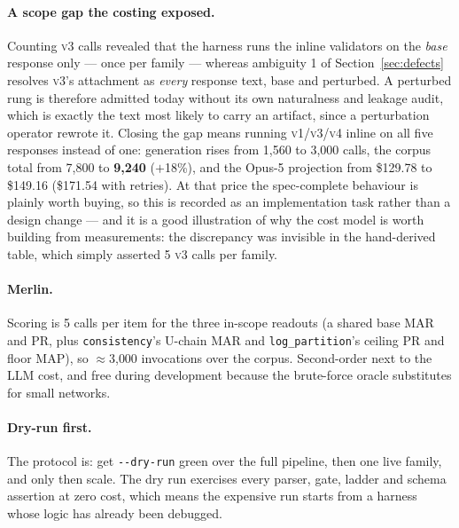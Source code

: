 \documentclass[11pt]{article}
\newcommand{\readout}[1]{\texttt{#1}}
\begin{document}
\paragraph{A scope gap the costing exposed.} Counting \textsc{v3} calls revealed that the harness
runs the inline validators on the \emph{base} response only --- once per family --- whereas
ambiguity 1 of Section~\ref{sec:defects} resolves \textsc{v3}'s attachment as \emph{every} response
text, base and perturbed. A perturbed rung is therefore admitted today without its own naturalness
and leakage audit, which is exactly the text most likely to carry an artifact, since a perturbation
operator rewrote it. Closing the gap means running \textsc{v1}/\textsc{v3}/\textsc{v4} inline on all
five responses instead of one: generation rises from 1{,}560 to 3{,}000 calls, the corpus total from
7{,}800 to \textbf{9{,}240} ($+$18\%), and the Opus-5 projection from \$129.78 to \$149.16
(\$171.54 with retries). At that price the spec-complete behaviour is plainly worth buying, so this
is recorded as an implementation task rather than a design change --- and it is a good illustration
of why the cost model is worth building from measurements: the discrepancy was invisible in the
hand-derived table, which simply asserted 5 \textsc{v3} calls per family.

\paragraph{Merlin.} Scoring is 5 calls per item for the three in-scope readouts (a shared base MAR
and PR, plus \readout{consistency}'s U-chain MAR and \readout{log\_partition}'s ceiling PR and
floor MAP), so $\approx$3{,}000 invocations over the corpus. Second-order next to the LLM cost, and
free during development because the brute-force oracle substitutes for small networks.

\paragraph{Dry-run first.} The protocol is: get \texttt{-{}-dry-run} green over the full pipeline,
then one live family, and only then scale. The dry run exercises every parser, gate, ladder and
schema assertion at zero cost, which means the expensive run starts from a harness whose logic has
already been debugged.

\clearpage
\end{document}
